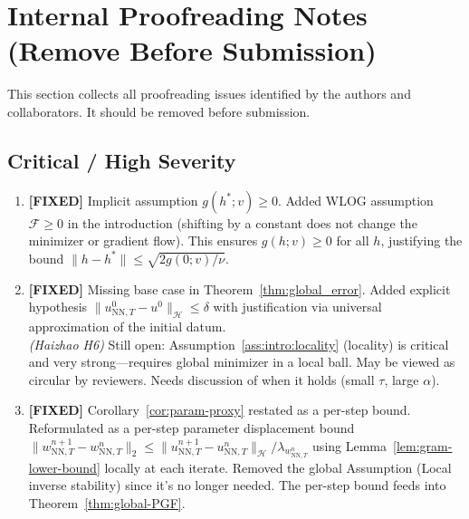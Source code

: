 \documentclass[twoside,11pt]{article}
\newcommand{\NN}{\mathrm{NN}}
\newcommand{\calF}{\mathcal{F}}
\newcommand{\calH}{\mathcal{H}}
\begin{document}



\iffalse
\newpage
\section*{Internal Proofreading Notes (Remove Before Submission)}
\small

This section collects all proofreading issues identified by the authors and collaborators.
It should be removed before submission.

\bigskip
\subsection*{Critical / High Severity}

\begin{enumerate}
\item {\color{green!50!black}\textbf{[FIXED]} Implicit assumption $g(h^*;v)\ge 0$.}
    Added WLOG assumption $\calF\ge 0$ in the introduction (shifting by a constant
    does not change the minimizer or gradient flow). This ensures $g(h;v)\ge 0$
    for all $h$, justifying the bound $\|h-h^*\|\le\sqrt{2g(0;v)/\nu}$.

\item {\color{green!50!black}\textbf{[FIXED]} Missing base case in Theorem~\ref{thm:global_error}.}
    Added explicit hypothesis $\|u^0_{\NN,T}-u^0\|_\calH\le\delta$ with justification
    via universal approximation of the initial datum.\\
    \emph{(Haizhao H6)} Still open: Assumption~\ref{ass:intro:locality} (locality)
    is critical and very strong---requires global minimizer in a local ball.
    May be viewed as circular by reviewers. Needs discussion of when it holds
    (small $\tau$, large $\alpha$).

\item {\color{green!50!black}\textbf{[FIXED]} Corollary~\ref{cor:param-proxy} restated as a per-step bound.}
    Reformulated as a per-step parameter displacement bound
    $\|w^{n+1}_{\NN,T}-w^n_{\NN,T}\|_2 \le \|u^{n+1}_{\NN,T}-u^n_{\NN,T}\|_\calH/\lambda_{w^n_{\NN,T}}$
    using Lemma~\ref{lem:gram-lower-bound} locally at each iterate.
    Removed the global Assumption (Local inverse stability) since it's no longer needed.
    The per-step bound feeds into Theorem~\ref{thm:global-PGF}.


\end{enumerate}
\end{document}
